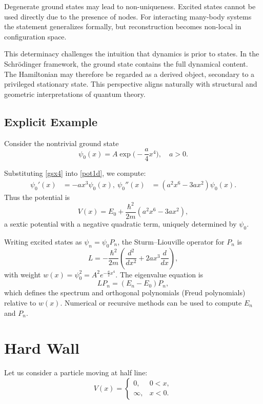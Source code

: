 Degenerate ground states may lead to non-uniqueness. Excited states 
cannot be used directly due to the presence of nodes. For interacting
many-body systems the statement generalizes formally, but 
reconstruction becomes non-local in configuration space. 

This determinacy challenges the intuition that dynamics is prior to 
states. In the Schr\"odinger framework, the ground state contains 
the full dynamical content. The Hamiltonian may therefore be regarded
as a derived object, secondary to a privileged stationary state. 
This perspective aligns naturally with structural and geometric 
interpretations of quantum theory.

\subsection{Explicit Example}

Consider the nontrivial ground state
\begin{equation}
    \label{gsx4}
\psi_0(x) = A \exp\Big(-\frac{a}{4} x^4\Big), \quad a>0.
\end{equation}

Substituting \eqref{gsx4} into \eqref{pot1d}, we compute:
\begin{align*}
\psi_0'(x) &= -a x^3 \psi_0(x), \
\psi_0''(x) &= (a^2 x^6 - 3 a x^2) \psi_0(x).
\end{align*}
Thus the potential is
\begin{equation}
V(x) = E_0 + \frac{\hbar^2}{2m} (a^2 x^6 - 3 a x^2),
\end{equation}
a sextic potential with a negative quadratic term, uniquely determined by $\psi_0$.

Writing excited states as $\psi_n = \psi_0 P_n$, the Sturm--Liouville operator for $P_n$ is
\begin{equation}
L = -\frac{\hbar^2}{2m} \left( \frac{d^2}{dx^2} + 2 a x^3 \frac{d}{dx} \right),
\end{equation}
with weight $w(x) = \psi_0^2 = A^2 e^{- \frac{a}{2} x^4}$. The eigenvalue equation is
\begin{equation}
L P_n = (E_n - E_0) P_n,
\end{equation}
which defines the spectrum and orthogonal polynomials (Freud polynomials) relative to $w(x)$.
Numerical or recursive methods can be used to compute $E_n$ and $P_n$.

\section{Hard Wall}
\label{cqe:hw}
Let us consider a particle moving at half line:
\begin{equation}
    \label{cqe:hwp}
V(x) = 
\begin{cases}
0, & 0 < x ,\\
\infty, & x<0.
\end{cases}
\end{equation}

